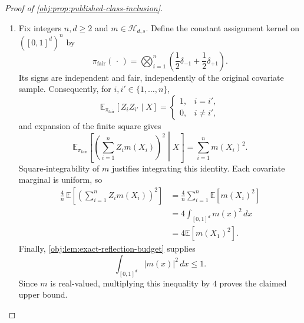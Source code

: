 \documentclass[11pt]{article}
\begin{document}
\begin{proof}[Proof of \cref{obj:prop:published-class-inclusion}]
\begin{enumerate}
\item Fix integers \(n,d\geq2\) and \(m\in\mathcal H_{d,s}\). Define the constant assignment kernel on \(([0,1]^d)^n\) by
\[
\pi_{\mathrm{fair}}(\,\cdot\,)
=
\bigotimes_{i=1}^n
\left(\frac12\delta_{-1}+\frac12\delta_{+1}\right).
\]
Its signs are independent and fair, independently of the original covariate sample. Consequently, for \(i,i'\in\{1,\ldots,n\}\),
\[
\mathbb E_{\pi_{\mathrm{fair}}}[Z_iZ_{i'}\mid X]
=
\begin{cases}
1,&i=i',\\
0,&i\ne i',
\end{cases}
\]
and expansion of the finite square gives
\[
\mathbb E_{\pi_{\mathrm{fair}}}
\left[
\left(\sum_{i=1}^n Z_i m(X_i)\right)^2
\middle|X
\right]
=
\sum_{i=1}^n m(X_i)^2.
\]
Square-integrability of \(m\) justifies integrating this identity. Each covariate marginal is uniform, so
\[
\begin{aligned}
\frac4n\,\mathbb E
\left[
\left(\sum_{i=1}^n Z_i m(X_i)\right)^2
\right]
&=\frac4n\sum_{i=1}^n\mathbb E[m(X_i)^2]\\
&=4\int_{[0,1]^d}m(x)^2\,dx\\
&=4\mathbb E[m(X_1)^2].
\end{aligned}
\]
Finally, \cref{obj:lem:exact-reflection-budget} supplies
\[
\int_{[0,1]^d}|m(x)|^2\,dx\leq1.
\]
Since \(m\) is real-valued, multiplying this inequality by \(4\) proves the claimed upper bound.
\end{enumerate}
\end{proof}
\end{document}
